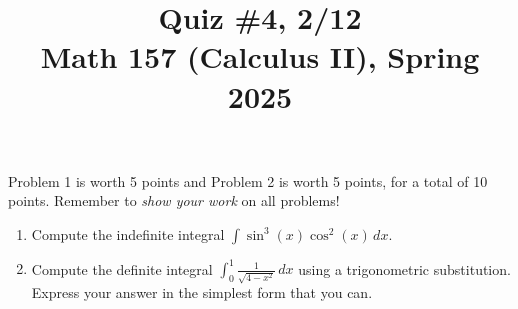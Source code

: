 \documentclass[11pt]{article}
\title{Quiz \#4, 2/12 \\ Math 157 (Calculus II), Spring 2025}
\date{}
\begin{document}
\maketitle

\thispagestyle{empty}

\vspace{-2cm}

Problem 1 is worth 5 points and Problem 2 is worth 5 points, for a total of 10 points. Remember to \emph{show your work} on all problems!

\begin{enumerate}
\item Compute the indefinite integral $\displaystyle \int \sin^3(x) \cos^2(x) \, dx$.

\vspace{8cm}

\item Compute the definite integral $\displaystyle \int_{0}^{1} \frac{1}{\sqrt{4-x^2}} \, dx$ using a trigonometric substitution. \\ Express your answer in the simplest form that you can.

\end{enumerate}
\end{document}
